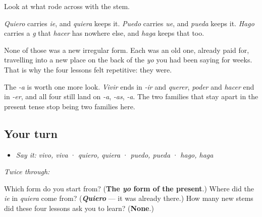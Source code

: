 \begin{culture}
Look at what rode across with the stem.

\emph{Quiero} carries \emph{ie}, and \emph{quiera} keeps it. \emph{Puedo} carries \emph{ue}, and \emph{pueda} keeps it. \emph{Hago} carries a \emph{g} that \emph{hacer} has nowhere else, and \emph{haga} keeps that too.

None of those was a new irregular form. Each was an old one, already paid for, travelling into a new place on the back of the \emph{yo} you had been saying for weeks. That is why the four lessons felt repetitive: they were.

The \emph{-a} is worth one more look. \emph{Vivir} ends in \emph{-ir} and \emph{querer}, \emph{poder} and \emph{hacer} end in \emph{-er}, and all four still land on \emph{-a}, \emph{-as}, \emph{-a}. The two families that stay apart in the present tense stop being two families here.
\end{culture}

\subsection*{Your turn}
\begin{itemize}
\raggedright
  \item \emph{Say it:} \emph{vivo, viva} · \emph{quiero, quiera} · \emph{puedo, pueda} · \emph{hago, haga}
\end{itemize}

\emph{Twice through:}

\begin{tcolorbox}[breakable,colback=teal!4,colframe=teal!35!black,title={Before you move on}]
Which form do you start from? (\textbf{The \emph{yo} form of the present}.) Where did the \emph{ie} in \emph{quiera} come from? (\emph{\textbf{Quiero}} — it was already there.) How many new stems did these four lessons ask you to learn? (\textbf{None}.)
\end{tcolorbox}
